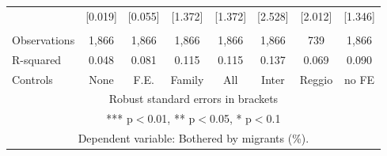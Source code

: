 \begin{tabular}{lccccccc}
 & [0.019] & [0.055] & [1.372] & [1.372] & [2.528] & [2.012] & [1.346] \\
 &  &  &  &  &  &  &  \\
Observations & 1,866 & 1,866 & 1,866 & 1,866 & 1,866 & 739 & 1,866 \\
R-squared & 0.048 & 0.081 & 0.115 & 0.115 & 0.137 & 0.069 & 0.090 \\
 Controls & None & F.E. & Family & All & Inter & Reggio & no FE \\ \hline
\multicolumn{8}{c}{ Robust standard errors in brackets} \\
\multicolumn{8}{c}{ *** p$<$0.01, ** p$<$0.05, * p$<$0.1} \\
\multicolumn{8}{c}{ Dependent variable: Bothered by migrants (\%).} \\
\end{tabular}

